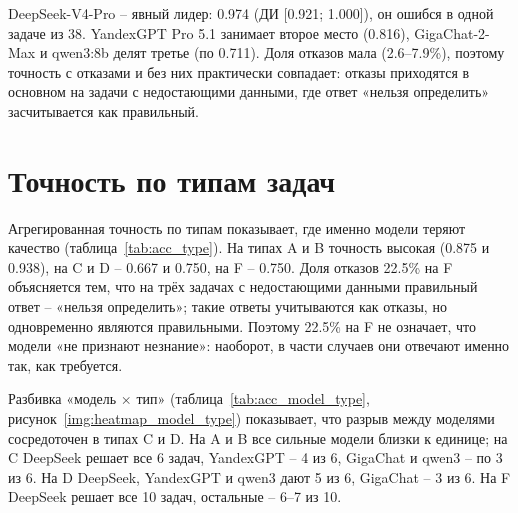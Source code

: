 \documentclass{bmstu}
\begin{document}

DeepSeek-V4-Pro -- явный лидер: 0.974 (ДИ [0.921; 1.000]), он ошибся в одной задаче из 38. YandexGPT Pro 5.1 занимает второе место (0.816), GigaChat-2-Max и qwen3:8b делят третье (по 0.711). Доля отказов мала (2.6--7.9\%), поэтому точность с отказами и без них практически совпадает: отказы приходятся в основном на задачи с недостающими данными, где ответ «нельзя определить» засчитывается как правильный.

\section{Точность по типам задач}
Агрегированная точность по типам показывает, где именно модели теряют качество (таблица~\ref{tab:acc_type}). На типах A и B точность высокая (0.875 и 0.938), на C и D -- 0.667 и 0.750, на F -- 0.750. Доля отказов 22.5\% на F объясняется тем, что на трёх задачах с недостающими данными правильный ответ -- «нельзя определить»; такие ответы учитываются как отказы, но одновременно являются правильными. Поэтому 22.5\% на F не означает, что модели «не признают незнание»: наоборот, в части случаев они отвечают именно так, как требуется.

\begin{table}[htbp]
\centering
\caption{Точность по типам задач (все модели вместе)}
\label{tab:acc_type}
\vspace{-10pt}
\end{table}

Разбивка «модель $\times$ тип» (таблица~\ref{tab:acc_model_type}, рисунок~\ref{img:heatmap_model_type}) показывает, что разрыв между моделями сосредоточен в типах C и D. На A и B все сильные модели близки к единице; на C DeepSeek решает все 6 задач, YandexGPT -- 4 из 6, GigaChat и qwen3 -- по 3 из 6. На D DeepSeek, YandexGPT и qwen3 дают 5 из 6, GigaChat -- 3 из 6. На F DeepSeek решает все 10 задач, остальные -- 6--7 из 10.
\end{document}
